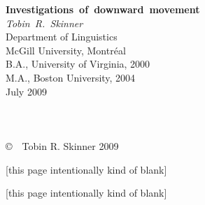\documentclass[twoside,12pt]{article}
\begin{document}
\sloppy
{}
\begin{center}
\thispagestyle{empty}
\mbox{\Large{\textbf{Investigations of downward movement}}}\\
\vspace{12pt}\mbox{\large{\textit{Tobin R. Skinner}}}\\
\vspace{6pt}Department of Linguistics\\
McGill University, Montr\'{e}al\\
\vspace{12pt}B.A., University of Virginia, 2000\\
M.A., Boston University, 2004\\
\vspace{248pt}July 2009\\
\vspace{18pt}\mbox{}\\
\mbox{}\\
\vspace{12pt}\mbox{\large{}}\\
\vspace{100pt}\normalsize \copyright ~~Tobin R. Skinner 2009\\
\end{center}
\clearpage
 \clearpage
 \clearpage
\tableofcontents\clearpage
{}
\setcounter{page}{1}
 \clearpage
 \clearpage
\vspace*{\fill}\begin{center}[this page intentionally kind of blank]\end{center}\vspace*{\fill}\clearpage
 \clearpage
 \clearpage
 \clearpage
\vspace*{\fill}\begin{center}[this page intentionally kind of blank]\end{center}\vspace*{\fill}\clearpage
\singlespacing
\section*{}

\end{document}
